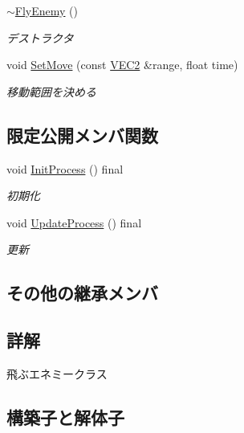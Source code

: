\begin{DoxyCompactItemize}
\mbox{\hyperlink{class_fly_enemy_ae4345f89a659b559c08d0bb879db7158}{$\sim$\+Fly\+Enemy}} ()
\begin{DoxyCompactList}\small\item\em デストラクタ \end{DoxyCompactList}\item 
void \mbox{\hyperlink{class_fly_enemy_a137e5a5f2adb7eacd282bbf662242cb3}{Set\+Move}} (const \mbox{\hyperlink{common_8h_afb0c5e21d4133ff4f200992c0b534e1b}{V\+E\+C2}} \&range, float time)
\begin{DoxyCompactList}\small\item\em 移動範囲を決める \end{DoxyCompactList}\end{DoxyCompactItemize}
\subsection*{限定公開メンバ関数}
\begin{DoxyCompactItemize}
\item 
void \mbox{\hyperlink{class_fly_enemy_afe4ddbf7089952146443f4ca71f55b13}{Init\+Process}} () final
\begin{DoxyCompactList}\small\item\em 初期化 \end{DoxyCompactList}\item 
void \mbox{\hyperlink{class_fly_enemy_a5122c8fea26ebbd0390acfd6e41931ff}{Update\+Process}} () final
\begin{DoxyCompactList}\small\item\em 更新 \end{DoxyCompactList}\end{DoxyCompactItemize}
\subsection*{その他の継承メンバ}


\subsection{詳解}
飛ぶエネミークラス 

\subsection{構築子と解体子}
\mbox{\label{class_fly_enemy_a92bb66e1f877440afab15a36ffebd74d}} 

